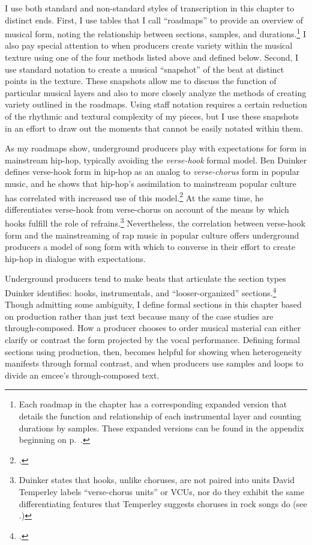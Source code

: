 I use both standard and non-standard styles of transcription in this chapter to distinct
ends. First, I use tables that I call ``roadmaps'' to provide an overview of musical form,
noting the  relationship between sections, samples, and durations.\footnote{
    Each roadmap in the chapter has a corresponding expanded version that details the 
    function and relationship of each instrumental layer and counting durations by 
    samples. These expanded versions can be found in the appendix beginning on
    p.~\pageref{appendix:fullroadmaps}.} 
I also pay special attention to when producers create variety within the musical texture
using one of the four methods listed above and defined below. Second, I use standard
notation to create a musical ``snapshot'' of the beat at distinct points in the texture.
These snapshots allow me to discuss the function of particular musical layers and also to
more closely analyze the methods of creating variety outlined in the roadmaps. Using staff
notation requires a certain reduction of the rhythmic and textural complexity of my pieces,
but I use these snapshots in an effort to draw out the moments that cannot be easily notated
within them.

As my roadmaps show, underground producers play with expectations for form in mainstream
hip-hop, typically avoiding the \emph{verse-hook} formal model. Ben Duinker defines 
verse-hook form in hip-hop as an analog to \emph{verse-chorus} form in popular music, and
he shows that hip-hop's assimilation to mainstream popular culture has correlated with
increased use of this model.\footnote{
    \autocite[105]{benduinkerSongFormMainstreaming2020}.}\label{duinkerhookdef}
At the same time, he differentiates verse-hook from verse-chorus on account of the means
by which hooks fulfill the role of refrains.\footnote{
    Duinker states that hooks, unlike choruses, are not paired into units David Temperley
    labels ``verse-chorus units'' or VCUs, nor do they exhibit the same differentiating
    features that Temperley suggests choruses in rock songs do
    (see \autocite[159\textit{ff}]{davidtemperleyMusicalLanguageRock2018}.)}
Nevertheless, the correlation between verse-hook form and the mainstreaming of rap music
in popular culture offers underground producers a model of song form with which to converse
in their  effort to create hip-hop in dialogue with expectations.

Underground producers tend to make beats that articulate the section types Duinker identifies:
hooks, instrumentals, and ``looser-organized'' sections.\footnote{
    \autocite[95--101]{benduinkerSongFormMainstreaming2020}.} 
Though admitting some ambiguity, I define formal sections in this chapter based on production
rather than just text because many of the case studies are through-composed. How a producer 
chooses to order musical material can either clarify or contrast the form projected by the
vocal performance. Defining formal sections using production, then, becomes helpful for
showing when heterogeneity manifests through formal contrast, and when producers use samples
and loops to divide an emcee's through-composed text.

